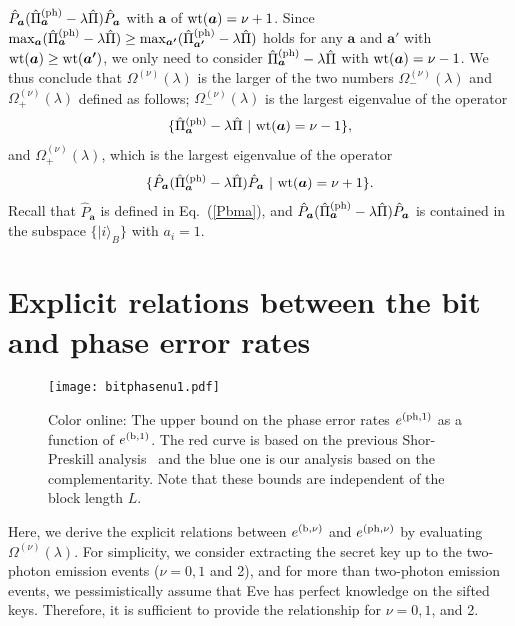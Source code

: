 \documentclass[prl,twocolumn,superscriptaddress,nofootinbib]{revtex4}
\def\U#1{{\rm #1}}
\newcommand{\ket}[1]{| #1 \rangle}
\begin{document}
$\hat{P}_{\bm{a}}(\hat{\Pi}^{\U{(ph)}}_{{\bm{a}}}-\lambda\hat{\Pi})\hat{P}_{\bm{a}}$ with ${\bm{a}}$ of $\U{wt}({\bm{a}})=\nu+1$.
Since 
$\max_{\bm{a}}(\hat{\Pi}^{\U{(ph)}}_{{\bm{a}}}-\lambda\hat{\Pi})\geq
\max_{\bm{a'}}(\hat{\Pi}^{\U{(ph)}}_{{\bm{a'}}}-\lambda\hat{\Pi})$ 
holds for any ${\bm{a}}$ and ${\bm{a'}}$ with $\U{wt}({\bm{a}})\geq \U{wt}({\bm{a'}})$, we only need to consider
$\hat{\Pi}^{\U{(ph)}}_{\bm{a}}-\lambda\hat{\Pi}$ with $\U{wt}({\bm{a}})=\nu-1$. 
We thus conclude that $\Omega^{(\nu)}(\lambda)$ is the larger of the two numbers
$\Omega^{(\nu)}_-(\lambda)$ and $\Omega^{(\nu)}_+(\lambda)$ defined as follows; 
$\Omega^{(\nu)}_-(\lambda)$ is the largest eigenvalue of the operator
\begin{align}
\{\hat{\Pi}^{\U{(ph)}}_{\bm{a}}-\lambda\hat{\Pi}~|~\U{wt}({\bm{a}})=\nu-1\},
  \label{omega-} 
\end{align}
and $\Omega^{(\nu)}_+(\lambda)$, which is the largest eigenvalue of the operator
\begin{align}
  \{\hat{P}_{\bm{a}}(\hat{\Pi}^{\U{(ph)}}_{\bm{a}}-\lambda\hat{\Pi})\hat{P}_{\bm{a}}~|~\U{wt}({\bm{a}})=\nu+1\}.
  \label{omega+}
  \end{align}
Recall that $\hat{P}_{\bm{a}}$ is defined in Eq.~(\ref{Pbma}),
and $\hat{P}_{\bm{a}}(\hat{\Pi}^{\U{(ph)}}_{\bm{a}}-\lambda\hat{\Pi})\hat{P}_{\bm{a}}$ is contained
in the subspace $\{\ket{i}_B\}$ with $a_i=1$. 




\section{Explicit relations between the bit and phase error rates}
\label{sec:formula}

\begin{figure}[t]
\texttt{[image: bitphasenu1.pdf]}
\caption{
  Color online: 
  The upper bound on the phase error rates $e^{(\U{ph},1)}$ as a function of $e^{(\U{b},1)}$. 
  The red curve is based on the previous Shor-Preskill analysis~\cite{Kiyoshi2012dps} 
  and the blue one is our analysis based on the complementarity.
  Note that these bounds are independent of the block length $L$. 
}
\label{fig:single}
\end{figure}

Here, we derive the explicit relations between $e^{(\U{b},\nu)}$ and $e^{(\U{ph},\nu)}$ by evaluating $\Omega^{(\nu)}(\lambda)$. 
For simplicity, we consider extracting the secret key up to the two-photon emission events ($\nu=0,1$ and 2),
and for more than two-photon emission events, we pessimistically 
assume that Eve has perfect knowledge on the sifted keys. 
Therefore, it is sufficient to provide the relationship for $\nu=0,1$, and 2.
\end{document}
